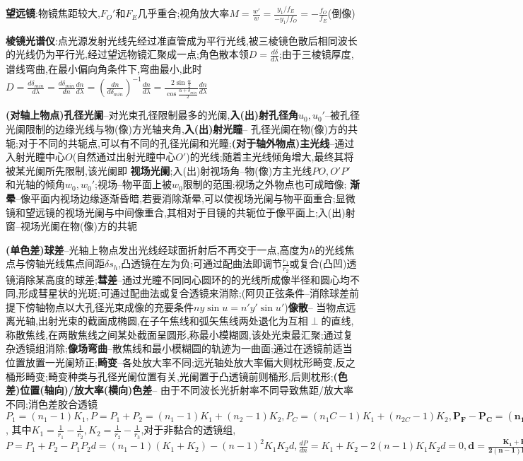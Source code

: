 \documentclass[10pt,a4paper]{article}
\begin{document}
\textbf{望远镜}:物镜焦距较大,$F_O'$和$F_E$几乎重合;视角放大率$M=\frac{w'}{w}=\frac{y_1/f_E}{-y_1/f_O}=-\frac{f_O}{f_E}$(倒像)

\textbf{棱镜光谱仪}:点光源发射光线先经过准直管成为平行光线,被三棱镜色散后相同波长的光线仍为平行光,经过望远物镜汇聚成一点;角色散本领$D=\frac{d\delta}{d\lambda}$;由于三棱镜厚度,谱线弯曲,在最小偏向角条件下,弯曲最小,此时$D=\frac{d\delta_{min}}{d\lambda}=\frac{d\delta_{min}}{dn}\frac{dn}{d\lambda}=(\frac{dn}{d\delta_{min}})^{-1}\frac{dn}{d\lambda}=\frac{2\sin\frac{\alpha}{2}}{\cos\frac{\alpha+\delta_{min}}{2}}\frac{dn}{d\lambda}$

\textbf{(对轴上物点)孔径光阑}--对光束孔径限制最多的光阑,\textbf{入(出)射孔径角}$u_0,u_0'$--被孔径光阑限制的边缘光线与物(像)方光轴夹角,\textbf{入(出)射光瞳}-- 孔径光阑在物(像)方的共轭;对于不同的共轭点,可以有不同的孔径光阑和光瞳;\textbf{(对于轴外物点)主光线}--通过入射光瞳中心$O$(自然通过出射光瞳中心$O'$)的光线;随着主光线倾角增大,最终其将被某光阑所先限制,该光阑即
\textbf{视场光阑};入(出)射视场角--物(像)方主光线$PO,O'P'$ 和光轴的倾角$w_0,w_0'$;视场--物平面上被$w_0$限制的范围;视场之外物点也可成暗像;
\textbf{渐晕}--像平面内视场边缘逐渐昏暗,若要消除渐晕,可以使视场光阑与物平面重合;显微镜和望远镜的视场光阑与中间像重合,其相对于目镜的共轭位于像平面上;入(出)射窗--视场光阑在物(像)方的共轭

\textbf{(单色差)球差}--光轴上物点发出光线经球面折射后不再交于一点,高度为$h$的光线焦点与傍轴光线焦点间距$\delta s_h$,凸透镜在左为负;可通过配曲法即调节$\frac{r_1}{r_2}$或复合(凸凹)透镜消除某高度的球差;\textbf{彗差}--通过光瞳不同同心圆环的的光线所成像半径和圆心均不同,形成彗星状的光斑;可通过配曲法或复合透镜来消除;(阿贝正弦条件--消除球差前提下傍轴物点以大孔径光束成像的充要条件$ny\sin u=n'y'\sin u'$)\textbf{像散}-- 当物点远离光轴,出射光束的截面成椭圆,在子午焦线和弧矢焦线两处退化为互相$\perp$的直线,称散焦线,在两散焦线之间某处截面呈圆形,称最小模糊圆,该处光束最汇聚;通过复杂透镜组消除;\textbf{像场弯曲}--散焦线和最小模糊圆的轨迹为一曲面;通过在透镜前适当位置放置一光阑矫正;\textbf{畸变}--各处放大率不同;远光轴处放大率偏大则枕形畸变,反之桶形畸变;畸变种类与孔径光阑位置有关,光阑置于凸透镜前则桶形,后则枕形;\textbf{(色差)位置(轴向)/放大率(横向)色差}-- 由于不同波长光折射率不同导致焦距/放大率不同;消色差胶合透镜$P_1=(n_1-1)K_1,P=P_1+P_2=(n_1-1)K_1+(n_2-1)K_2,P_C=(n_1C-1)K_1+(n_{2C}-1)K_2,\bm{P_F-P_C=(n_{1F}-n_{1C})K_1+(n_{2F}-n_{2C})K_2=0}$, 其中$K_1=\frac{1}{r_1}-\frac{1}{r_2},K_2=\frac{1}{r_2}-\frac{1}{r_3}$,对于非黏合的透镜组,$P=P_1+P_2-P_1P_2d=(n_1-1)(K_1+K_2)-(n-1)^2K_1K_2d,\frac{dP}{dn}=K_1+K_2-2(n-1)K_1K_2d=0,\bm{d=\frac{K_1+K_2}{2(n-1)K_1K_2d}=\frac{P_1+P_2}{2P_1P_2}=\frac{f_1+f_2}{2}}$
\end{document}
